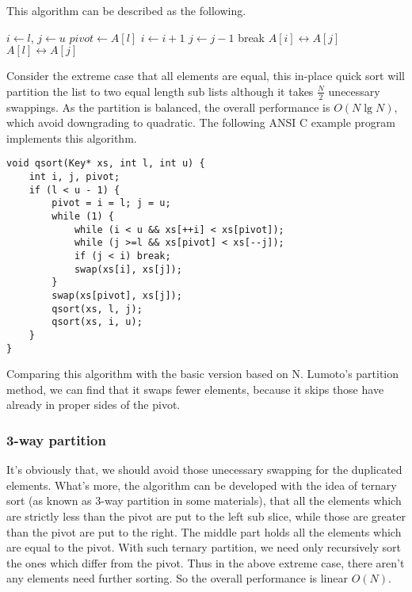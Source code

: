 \documentclass{article}
\begin{document}
This algorithm can be described as the following.

\begin{algorithmic}
 \Comment{sort range $[l, u)$}
   
    \State $i \gets l$, $j \gets u$
    \State $pivot \gets A[l]$
    \Loop
      \Repeat
        \State $i \gets i + 1$
       
      \Repeat
        \State $j \gets j - 1$
       
        \State break
      \EndIf
      \State {} $A[i] \leftrightarrow A[j]$
    \EndLoop
    \State {} $A[l] \leftrightarrow A[j]$ 
    \State {}
    \State {}
  \EndIf
\EndProcedure
\end{algorithmic}

Consider the extreme case that all elements are equal, this in-place quick sort will partition
the list to two equal length sub lists although it takes $\frac{N}{2}$ unecessary swappings.
As the partition is balanced, the overall performance is $O(N \lg N)$, which avoid downgrading
to quadratic. The following ANSI C example program implements this algorithm.

\lstset{language=C}
\begin{lstlisting}
void qsort(Key* xs, int l, int u) {
    int i, j, pivot;
    if (l < u - 1) {
        pivot = i = l; j = u;
        while (1) {
            while (i < u && xs[++i] < xs[pivot]);
            while (j >=l && xs[pivot] < xs[--j]);
            if (j < i) break;
            swap(xs[i], xs[j]);
        }
        swap(xs[pivot], xs[j]);
        qsort(xs, l, j);
        qsort(xs, i, u);
    }
}
\end{lstlisting}

Comparing this algorithm with the basic version based on N. Lumoto's partition method, we can find
that it swaps fewer elements, because it skips those have already in proper sides of the pivot.

\subsubsection{3-way partition}

It's obviously that, we should avoid those unecessary swapping for the duplicated elements. What's more,
the algorithm can be developed with the idea of ternary sort (as known as 3-way partition in some
materials), that all the elements which are strictly less than the pivot are put to the left sub slice,
while those are greater than the pivot are put to the right. The middle part holds all the elements 
which are equal to the pivot. With such ternary partition, we need only recursively sort the ones
which differ from the pivot. Thus in the above extreme case, there aren't any elements need further
sorting. So the overall performance is linear $O(N)$.
\end{document}
